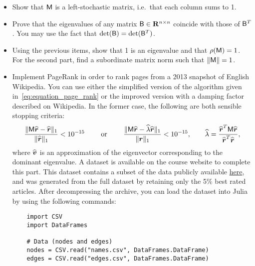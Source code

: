 \begin{exercise}
\begin{itemize}
        \item
            Show that $\mathsf M$ is a left-stochastic matrix,
            i.e.\ that each column sums to 1.

        \item
            Prove that the eigenvalues of any matrix $\mathsf B \in \mathbf R^{n \times n}$ coincide with those of $\mathsf B^T$.
            You may use the fact that $\det(\mathsf B) = \det(\mathsf B^T)$.

        \item
            Using the previous items,
            show that 1 is an eigenvalue and that $\rho(\mathsf M) = 1$.
            For the second part, find a subordinate matrix norm such that $\lVert\mathsf M\rVert= 1$.

        \item
            Implement PageRank  in order to rank pages from a 2013 snapshot of English Wikipedia.
            You can use either the simplified version of the algorithm given in~\eqref{eq:equation_page_rank} or the improved version with a damping factor described on Wikipedia.
            In the former case,
            the following are both sensible stopping criteria:
            \[
                \frac{\lVert\mathsf M \widehat{\mathbf{\boldsymbol{r}}} - \widehat{\mathbf{\boldsymbol{r}}}\rVert_1}{\lVert\widehat{\mathbf{\boldsymbol{r}}}\rVert_1} < 10^{-15}
                \qquad \text{ or } \qquad
                \frac{\lVert\mathsf M \widehat{\mathbf{\boldsymbol{r}}} - \widehat \lambda \widehat{\mathbf{\boldsymbol{r}}}\rVert_1}{\lVert\mathbf{\boldsymbol{r}}\rVert_1} < 10^{-15},
                \qquad \widehat \lambda = \frac{\widehat{\mathbf{\boldsymbol{r}}}^T \mathsf M \widehat{\mathbf{\boldsymbol{r}}}}{\widehat{\mathbf{\boldsymbol{r}}}^T \widehat{\mathbf{\boldsymbol{r}}}},
            \]
            where $\widehat{\mathbf{\boldsymbol{v}}}$ is an approximation of the eigenvector corresponding to the dominant eigenvalue.
            A dataset is available on the course website to complete this part.
            This dataset contains a subset of the data publicly available \hyperlink{https://snap.stanford.edu/data/enwiki-2013.html}{here},
            and was generated from the full dataset by retaining only the 5\% best rated articles.
            After decompressing the archive,
            you can load the dataset into Julia by using the following commands:

            \begin{verbatim}
    import CSV
    import DataFrames

    # Data (nodes and edges)
    nodes = CSV.read("names.csv", DataFrames.DataFrame)
    edges = CSV.read("edges.csv", DataFrames.DataFrame)


\end{verbatim}
\end{itemize}
\end{exercise}
